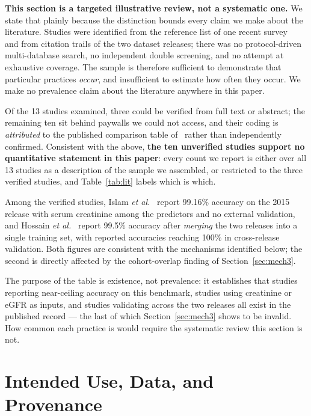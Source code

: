 \documentclass[conference]{IEEEtran}
\begin{document}
\textbf{This section is a targeted illustrative review, not a systematic
one.} We state that plainly because the distinction bounds every claim we
make about the literature. Studies were identified from the reference list of
one recent survey~\cite{kabir2026} and from citation trails of the two
dataset releases; there was no protocol-driven multi-database search, no
independent double screening, and no attempt at exhaustive coverage. The
sample is therefore sufficient to demonstrate that particular practices
\emph{occur}, and insufficient to estimate how often they occur. We make no
prevalence claim about the literature anywhere in this paper.

Of the 13 studies examined, three could be verified from full text or
abstract; the remaining ten sit behind paywalls we could not access, and
their coding is \emph{attributed} to the published comparison table
of~\cite{kabir2026} rather than independently confirmed. Consistent with the
above, \textbf{the ten unverified studies support no quantitative statement
in this paper}: every count we report is either over all 13 studies as a
description
of the sample we assembled, or restricted to the three verified studies, and
Table~\ref{tab:lit} labels which is which.

Among the verified studies, Islam \emph{et al.}~\cite{islam2023} report 99.16\%
accuracy on the 2015 release with serum creatinine among the predictors and no
external validation, and Hossain \emph{et al.}~\cite{hossain2025} report 99.5\%
accuracy after \emph{merging} the two releases into a single training set,
with reported accuracies reaching 100\% in cross-release validation. Both
figures are consistent with the mechanisms identified below; the second is
directly affected by the cohort-overlap finding of
Section~\ref{sec:mech3}.



The purpose of the table is existence, not prevalence: it establishes that
studies reporting near-ceiling accuracy on this benchmark, studies using
creatinine or eGFR as inputs, and studies validating across the two releases
all exist in the published record --- the last of which
Section~\ref{sec:mech3} shows to be invalid. How common each practice is
would require the systematic review this section is not.

\section{Intended Use, Data, and Provenance}
\label{sec:data}
\end{document}
